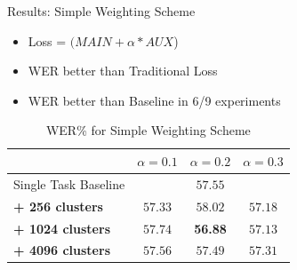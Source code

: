 \documentclass[final]{beamer} %
\begin{document}
\begin{frame}
\begin{columns}
\begin{column}{0.3\textwidth}
{          \vfill
          
        
        \begin{block}{\boxnumber Results: Simple Weighting Scheme}
          \begin{itemize}
          \item Loss = $(MAIN + \alpha*AUX$)
          \item WER better than Traditional Loss
          \item WER better than Baseline in 6/9 experiments
          \end{itemize}
        \end{block}        

        \vfill
        
        
        \begin{table}[!htbp]
          \centering
          \caption{WER\% for Simple Weighting Scheme}
          \begin{adjustbox}{width=\textwidth}
            \begin{tabular}{lccc}
              \toprule
              & $\alpha = 0.1 $ & $\alpha = 0.2 $ & $\alpha = 0.3 $\\
              \midrule
              Single Task Baseline  &  \multicolumn{3}{c}{$57.55$ \raisebox{.33\height}{\footnotesize{$\pm 1.82$}}}     \\
              
              \textbf{+ 256 clusters}  &  $57.33$ \raisebox{.33\height}{\footnotesize{$\pm 2.49$}}   &  $58.02$ \raisebox{.33\height}{\footnotesize{$\pm 2.09$}}     & $57.18$ \raisebox{.33\height}{\footnotesize{$\pm 0.56$}} \\
              
              \textbf{+ 1024 clusters}   & $ 57.74$ \raisebox{.33\height}{\footnotesize{$\pm 3.06$}}    & \textbf{56.88}  \raisebox{.33\height}{\footnotesize{$\pm 1.33$}}    & $57.13  $ \raisebox{.33\height}{\footnotesize{$\pm 1.55$}}  \\
              
              \textbf{+ 4096 clusters}   &  $57.56$ \raisebox{.33\height}{\footnotesize{$\pm 2.53$}}  & $57.49$ \raisebox{.33\height}{\footnotesize{$\pm  3.17$}}   &  $57.31$ \raisebox{.33\height}{\footnotesize{$\pm 1.31$}}  \\
              \bottomrule
            \end{tabular}
          \end{adjustbox}
        \end{table}
        
}
\end{column}
\end{columns}
\end{frame}
\end{document}
